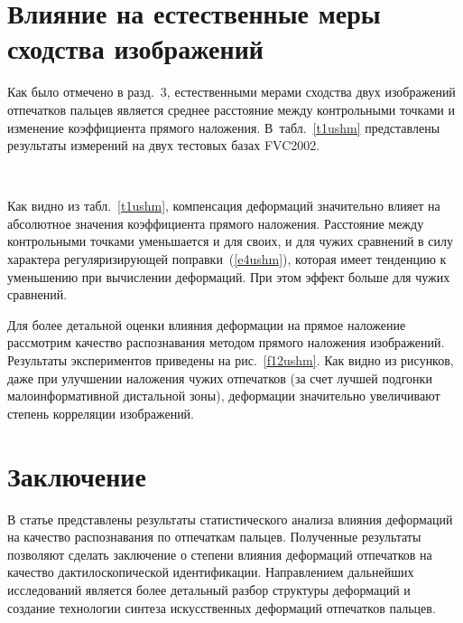 \begin{multicols}{2}



     \section{Влияние на естественные меры сходства изображений}

      Как было отмечено в разд.~3, естественными мерами сходства двух изображений 
отпечатков пальцев является среднее расстояние между контрольными точками и 
изменение коэффициента прямого наложения. В~табл.~\ref{t1ushm} представлены 
результаты измерений на двух тестовых базах FVC2002.
      

\begin{figure*} %
\vspace*{1pt}
\begin{center}
\mbox{%
\epsfxsize=165.122mm
}
\end{center}
\vspace*{-9pt}
\end{figure*}
      Как видно из табл.~\ref{t1ushm}, компенсация деформаций значительно влияет на 
абсолютное значения коэффициента прямого наложения. Расстояние между 
контрольными точками уменьшается и для своих, и для чужих сравнений в силу характера 
регуляризирующей поправки~(\ref{e4ushm}), которая имеет тенденцию к уменьшению 
при вычислении деформаций. При этом эффект больше для чужих сравнений.
      
      Для более детальной оценки влияния деформации на прямое наложение 
рассмотрим качество распознавания методом прямого наложения изоб\-ра\-же\-ний. 
Результаты экспериментов приведены на рис.~\ref{f12ushm}. Как видно из рисунков, даже 
при улучшении наложения чужих отпечатков (за счет лучшей подгонки 
малоинформативной дистальной зоны), деформации значительно увеличивают степень 
корреляции изображений. 
 
     \section*{Заключение}
      
      В статье представлены результаты статистического анализа влияния деформаций 
на качество распознавания по отпечаткам пальцев. Полученные результаты позволяют 
сделать заключение о степени влияния деформаций отпечатков на качество 
дактилоскопической идентификации. На\-прав\-ле\-ни\-ем дальнейших исследований является 
более детальный разбор структуры деформаций и создание технологии синтеза 
искусственных деформаций отпечатков пальцев.


\end{multicols}
